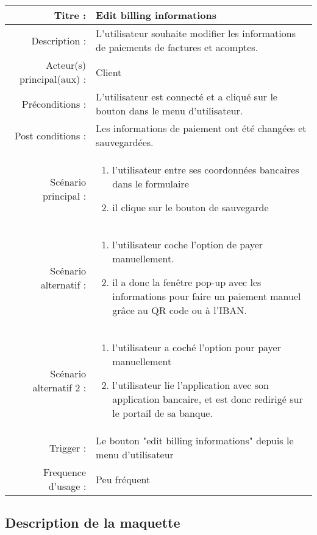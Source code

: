 \documentclass[../rapport.tex]{subfiles}
\begin{document}
\begin{tabular}{|r|p{9cm}|}
    \hline
    Titre : & Edit billing informations\\
    \hline
    Description : & L'utilisateur souhaite modifier les informations de paiements de factures et acomptes. \\
    \hline
    Acteur(s) principal(aux) : & Client \\
    \hline
    Préconditions : & L'utilisateur est connecté et a cliqué sur le bouton dans le menu d'utilisateur.\\
    \hline 
    Post conditions : & Les informations de paiement ont été changées et sauvegardées.\\
    \hline 
    Scénario principal : & \begin{enumerate}
        \item l'utilisateur entre ses coordonnées bancaires dans le formulaire
        \item il clique sur le bouton de sauvegarde 
    \end{enumerate} \nointerlineskip \\
    \hline
    Scénario alternatif : & \begin{enumerate}
        \item l'utilisateur coche l'option de payer manuellement. 
        \item il a donc la fenêtre pop-up avec les informations pour faire un paiement manuel grâce au QR code ou à l'IBAN.
    \end{enumerate} \nointerlineskip \\
    \hline 
    Scénario alternatif 2 : & \begin{enumerate}
        \item l'utilisateur a coché l'option pour payer manuellement
        \item l'utilisateur lie l'application avec son application bancaire, et est donc redirigé sur le portail de sa banque.
    \end{enumerate} \nointerlineskip \\
    \hline
    Trigger : & Le bouton "edit billing informations" depuis le menu d'utilisateur\\
    \hline
    Frequence d'usage : & Peu fréquent\\
    \hline
\end{tabular}

\subsection{Description de la maquette}
\end{document}
